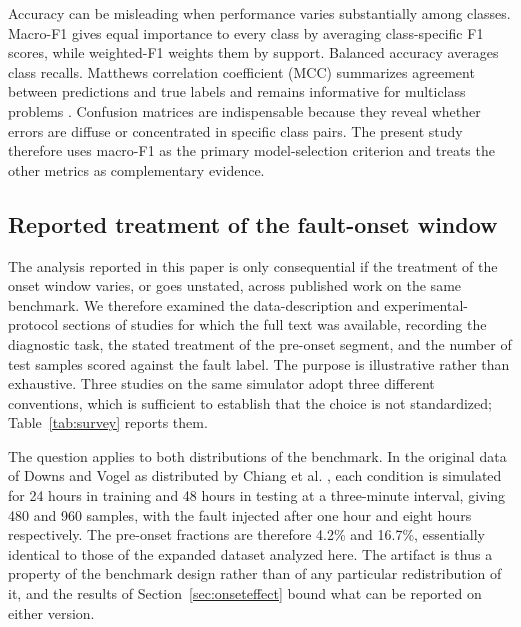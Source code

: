 \documentclass[10pt,twocolumn,a4paper]{article}
\begin{document}
Accuracy can be misleading when performance varies substantially among classes.
Macro-F1 gives equal importance to every class by averaging class-specific F1
scores, while weighted-F1 weights them by support. Balanced accuracy averages
class recalls. Matthews correlation coefficient (MCC) summarizes agreement between predictions and true labels and
remains informative for multiclass problems \cite{matthews1975mcc}. Confusion
matrices are indispensable because they reveal whether errors are diffuse or
concentrated in specific class pairs. The present study therefore uses
macro-F1 as the primary model-selection criterion and treats the other metrics
as complementary evidence.

\subsection{Reported treatment of the fault-onset window}
\label{sec:survey}

The analysis reported in this paper is only consequential if the treatment of
the onset window varies, or goes unstated, across published work on the same
benchmark. We therefore examined the data-description and experimental-protocol
sections of studies for which the full text was available, recording the
diagnostic task, the stated treatment of the pre-onset segment, and the number
of test samples scored against the fault label. The purpose is illustrative
rather than exhaustive. Three studies on the same simulator adopt three
different conventions, which is sufficient to establish that the choice is not
standardized; Table~\ref{tab:survey} reports them.

The question applies to both distributions of the benchmark. In the original
data of Downs and Vogel as distributed by Chiang et al.
\cite{chiang2001book, downs1993tep}, each condition is simulated for 24 hours in
training and 48 hours in testing at a three-minute interval, giving 480 and 960
samples, with the fault injected after one hour and eight hours respectively.
The pre-onset fractions are therefore 4.2\% and 16.7\%, essentially identical
to those of the expanded dataset analyzed here. The artifact is thus a property
of the benchmark design rather than of any particular redistribution of it,
and the results of Section~\ref{sec:onseteffect} bound what can be reported on
either version.
\end{document}
